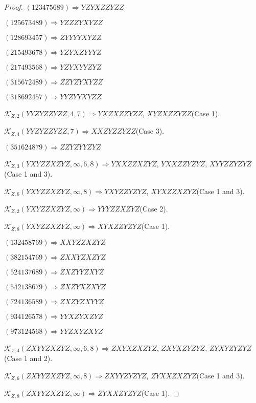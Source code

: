 \documentclass[12pt]{article}
\theoremstyle{plain}
\theoremstyle{definition}
\theoremstyle{remark}
\newcommand{\fancy}[1]{\mathcal{#1}}
\def\K{\fancy{K}}
\begin{document}
\begin{proof}
	
	
	$(1 2 3 4 7 5 6 8 9)\Rightarrow YZYXZZYZZ$
	
	$(1 2 5 6 7 3 4 8 9)\Rightarrow YZZZYXYZZ$
	
	$(1 2 8 6 9 3 4 5 7)\Rightarrow ZYYYYXYZZ$
	
	$(2 1 5 4 9 3 6 7 8)\Rightarrow YZYXZYYYZ$
	
	$(2 1 7 4 9 3 5 6 8)\Rightarrow YZYXYYZYZ$
	
	$(3 1 5 6 7 2 4 8 9)\Rightarrow ZZYZYXYZZ$
	
	$(3 1 8 6 9 2 4 5 7)\Rightarrow YYZYYXYZZ$
	
	
	
	$\K_{Z,2}(YYZYZZYZZ,4, 7)\Rightarrow $$YXZXZZYZZ$, $XYZXZZYZZ$(Case 1).
	
	$\K_{Z,4}(YYZYZZYZZ,7)\Rightarrow $$XXZYZZYZZ$(Case 3).
	
	
	
	$(3 5 1 6 2 4 8 7 9)\Rightarrow ZZYZYYZYZ$
	
	
	
	$\K_{Z,3}(YXYZZXZYZ,\infty,6, 8)\Rightarrow $$YXXZZXZYZ$, $YXXZZYZYZ$, $XYYZZYZYZ$(Case 1 and 3).
	
	$\K_{Z,6}(YXYZZXZYZ,\infty,8)\Rightarrow $$YXYZZYZYZ$, $XYXZZXZYZ$(Case 1 and 3).
	
	$\K_{Z,2}(YXYZZXZYZ,\infty)\Rightarrow $$YYYZZXZYZ$(Case 2).
	
	$\K_{Z,8}(YXYZZXZYZ,\infty)\Rightarrow $$XYXZZYZYZ$(Case 1).
	
	
	
	$(1 3 2 4 5 8 7 6 9)\Rightarrow XXYZZXZYZ$
	
	$(3 8 2 1 5 4 7 6 9)\Rightarrow ZXXYZXZYZ$
	
	$(5 2 4 1 3 7 6 8 9)\Rightarrow ZXZYYZXYZ$
	
	$(5 4 2 1 3 8 6 7 9)\Rightarrow ZXZYXZXYZ$
	
	$(7 2 4 1 3 6 5 8 9)\Rightarrow ZXZYZXYYZ$
	
	$(9 3 4 1 2 6 5 7 8)\Rightarrow YYXZYXZYZ$
	
	$(9 7 3 1 2 4 5 6 8)\Rightarrow YYZXYZXYZ$
	
	
	
	$\K_{Z,4}(ZXYYZXZYZ,\infty,6, 8)\Rightarrow $$ZXYXZXZYZ$, $ZXYXZYZYZ$, $ZYXYZYZYZ$(Case 1 and 2).
	
	$\K_{Z,6}(ZXYYZXZYZ,\infty,8)\Rightarrow $$ZXYYZYZYZ$, $ZYXXZXZYZ$(Case 1 and 3).
	
	$\K_{Z,8}(ZXYYZXZYZ,\infty)\Rightarrow $$ZYXXZYZYZ$(Case 1).
	

\end{proof}
\end{document}
